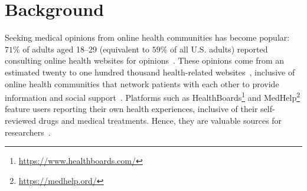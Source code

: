 \documentclass{bmcart}
\begin{document}



\section{Background}\label{sec:background}

Seeking medical opinions from online health communities has become popular: $71\%$ of adults aged 18--29 (equivalent to $59\%$ of all
U.S. adults) reported consulting online health
websites for opinions~\cite{fox2013health}.  These opinions come from an estimated
twenty to one hundred thousand health-related
websites~\cite{diaz2002patients}, inclusive of online health
communities that network patients with each other to provide
information and social support~\cite{johnston2013online}. Platforms
such as
HealthBoards\footnote{\scriptsize{\url{https://www.healthboards.com/}}}
and MedHelp\footnote{{\scriptsize{\url{https://medhelp.ord/}}}}
feature users reporting their own health experiences, inclusive of
their self-reviewed drugs and medical treatments.  Hence, they are
valuable sources for researchers~\cite{leyens2017use,martin2014big}.
\end{document}
